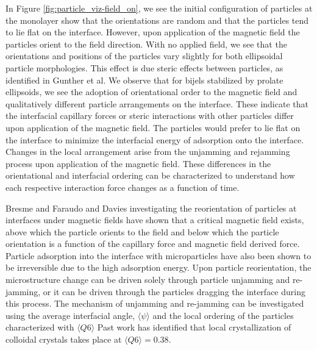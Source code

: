 In Figure \ref{fig:particle_viz-field_on}, we see the initial configuration of particles at the monolayer show that the orientations are random and that the 
particles tend to lie flat on the interface. However, upon application of the magnetic field the particles orient to the field direction. With no applied field,
we see that the orientations and positions of the particles vary slightly for both ellipsoidal particle morphologies. This effect is due steric effects between particles,
as identified in Gunther et al. \cite{gunther_timescales_2014} We observe that for bijels stabilized by prolate ellipsoids, we see the adoption of orientational order
to the magnetic field and qualitatively different particle arrangements on the interface. These indicate that the interfacial capillary forces or steric interactions 
with other particles differ upon application of the magnetic field. The particles would prefer to lie flat on the interface to minimize the interfacial energy of 
adsorption onto the interface. Changes in the local arrangement arise from the unjamming and rejamming process upon application of the magnetic field. These differences 
in the orientational and interfacial ordering can be characterized to understand how each respective interaction force changes as a function of time.

Bresme and Faraudo and Davies investigating the reorientation of particles at interfaces under magnetic fields have shown that a critical magnetic field exists, 
above which the particle orients to the field and below which the particle orientation is a function of the capillary force and magnetic field derived force. 
\cite{davies_interface_2014} \cite{bresme_orientational_2007} Particle adsorption into the interface with microparticles have also been shown to be irreversible due 
to the high adsorption energy. Upon particle reorientation, the microstructure change can be driven solely through particle unjamming and re-jamming, or it can be 
driven through the particles dragging the interface during this process. The mechanism of unjamming and re-jamming can be investigated using the average interfacial 
angle, $\langle \psi \rangle$ and the local ordering of the particles characterized with  $\langle Q6 \rangle$ Past work has identified that local crystallization 
of colloidal crystals takes place at \(\langle Q6 \rangle = 0.38\). \cite{toxvaerd_role_2020}

